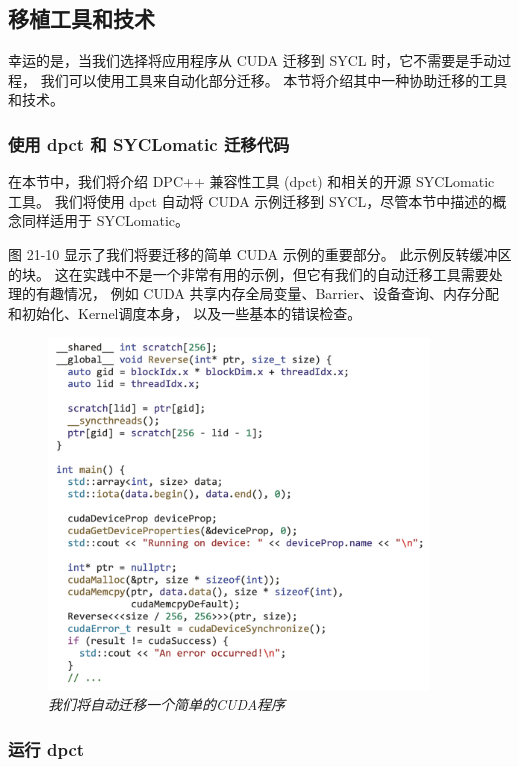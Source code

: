 \subsection{移植工具和技术}
幸运的是，当我们选择将应用程序从 CUDA 迁移到 SYCL 时，它不需要是手动过程，
我们可以使用工具来自动化部分迁移。 本节将介绍其中一种协助迁移的工具和技术。

\subsubsection{使用 dpct 和 SYCLomatic 迁移代码}
在本节中，我们将介绍 DPC++ 兼容性工具 (dpct) 和相关的开源 SYCLomatic 工具。 
我们将使用 dpct 自动将 CUDA 示例迁移到 SYCL，尽管本节中描述的概念同样适用于 SYCLomatic。

图 21-10 显示了我们将要迁移的简单 CUDA 示例的重要部分。 此示例反转缓冲区的块。 
这在实践中不是一个非常有用的示例，但它有我们的自动迁移工具需要处理的有趣情况，
例如 CUDA 共享内存全局变量、Barrier、设备查询、内存分配和初始化、Kernel调度本身， 以及一些基本的错误检查。

\begin{figure}[H]
	\centering
	\includegraphics[width=0.9\textwidth]{figs/F21.10.png}
	\caption{\textit{我们将自动迁移一个简单的CUDA程序 }}
\end{figure}

\subsubsection{运行 dpct}

